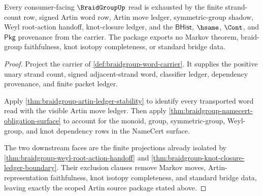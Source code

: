 \begin{theorem}
\label{thm:braidgroup-scoped-artin-source-package}
Every consumer-facing $\BraidGroupUp$ read is exhausted by the finite
strand-count row, signed Artin word row, Artin move ledger,
symmetric-group shadow, Weyl root-action handoff, knot-closure ledger, and the
$\mathsf{BHist}$, $\hsame$, $\Cont$, and $\mathsf{Pkg}$ provenance from the
carrier. The package exports no Markov theorem, braid-group faithfulness, knot
isotopy completeness, or standard bridge data.
\end{theorem}
\begin{proof}
Project the carrier of \autoref{def:braidgroup-word-carrier}. It supplies the
positive unary strand count, signed adjacent-strand word, classifier ledger,
dependency provenance, and finite packet ledger.

Apply \autoref{thm:braidgroup-artin-ledger-stability} to identify every
transported word read with the visible Artin move ledger. Then apply
\autoref{thm:braidgroup-namecert-obligation-surface} to account for the
monoid, group, symmetric-group, Weyl-group, and knot dependency rows in the
NameCert surface.

The two downstream faces are the finite projections already isolated by
\autoref{thm:braidgroup-weyl-root-action-handoff} and
\autoref{thm:braidgroup-knot-closure-ledger-boundary}. Their exclusion clauses
remove Markov moves, Artin-representation faithfulness, knot isotopy
completeness, and standard bridge data, leaving exactly the scoped Artin source
package stated above.
\end{proof}


